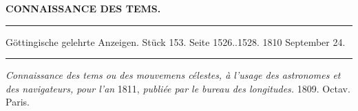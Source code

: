 \clearpage
\begingroup
\pagestyle{empty}
\thispagestyle{empty}
\noindent\makebox[10mm][l]{}%
\parbox[b]{\dimexpr\textwidth-20mm\relax}{\centering\small\textbf{CONNAISSANCE DES TEMS.}}%
\par\nobreak\medskip
\begin{center}
\parbox{.92\linewidth}{\centering\small
\rule{\linewidth}{.3pt}\par\smallskip
Göttingische gelehrte Anzeigen. Stück 153. Seite 1526..1528. 1810 September 24.\par\smallskip
\rule{\linewidth}{.3pt}}
\end{center}
\par\medskip

\emph{Connaissance des tems ou des mouvemens célestes, à l'usage des astronomes et des navigateurs, pour l'an} 1811, \emph{publiée par le bureau des longitudes.} 1809. Octav. Paris.

